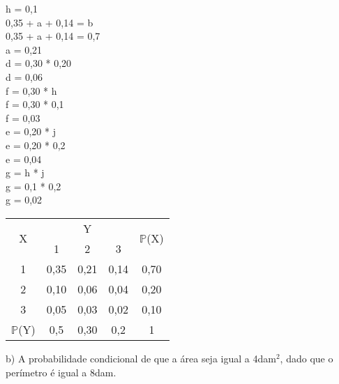 \documentclass[12pt,a4paper]{article}
\begin{document}
\begin{center}
		h = 0,1
		\vspace{1cm}\\
		0,35 + a + 0,14 = b
		\vspace{0.25cm}\\
		0,35 + a + 0,14 = 0,7
		\vspace{0.25cm}\\
		a = 0,21
		\vspace{1cm}\\
		d = 0,30 * 0,20
		\vspace{0.25cm}\\ 
		d = 0,06
		\vspace{1cm}\\
		f = 0,30 * h
		\vspace{0.25cm}\\
		f = 0,30 * 0,1
		\vspace{0.25cm}\\
		f = 0,03
		\vspace{1cm}\\
		e = 0,20 * j
		\vspace{0.25cm}\\
		e = 0,20 * 0,2
		\vspace{0.25cm}\\
		e = 0,04
		\vspace{1cm}\\
		g = h * j
		\vspace{0.25cm}\\
		g = 0,1 * 0,2
		\vspace{0.25cm}\\
		g = 0,02
		\vspace{1cm}\\
		\begin{tabular}{|c|c|c|c|c|}\hline
			\multirow{2}{*}{X} & \multicolumn{3}{c|}{Y} & \multirow{2}{*}{$\mathbb{P}$(X)}\\ \cline{2-4}
			& 1 & 2 & 3 & \\ \hline
			1 & 0,35 & 0,21 & 0,14 & 0,70\\ \hline
			2 & 0,10 & 0,06 & 0,04 & 0,20\\ \hline
			3 & 0,05 & 0,03 & 0,02 & 0,10 \\ \hline
			$\mathbb{P}$(Y) & 0,5 & 0,30 & 0,2 & 1\\ \hline	
		\end{tabular}
	\end{center}
	\vspace{1.5cm}
	b) A probabilidade condicional de que a área seja igual a 4dam$^2$, dado que o perímetro é igual a 8dam.\\
\end{document}
